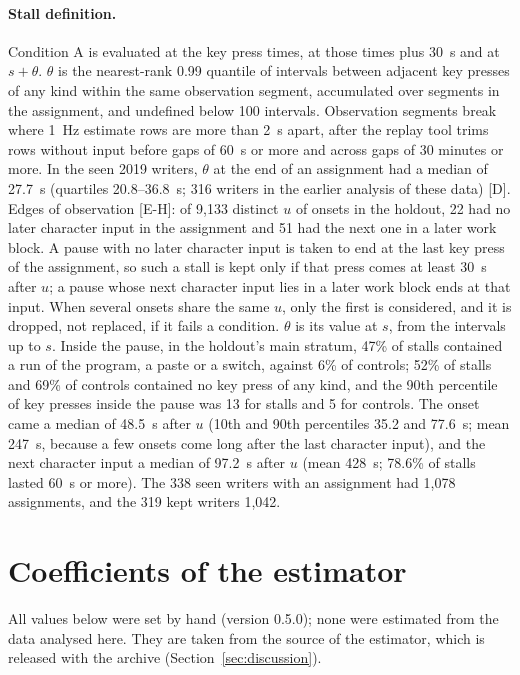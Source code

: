 \paragraph{Stall definition.} Condition A is evaluated at the key press times, at those times plus 30~s and at $s +
\theta$. $\theta$ is the nearest-rank 0.99 quantile of intervals between adjacent key presses of any kind within the
same observation segment, accumulated over segments in the assignment, and undefined below 100 intervals. Observation
segments break where 1~Hz estimate rows are more than 2~s apart, after the replay tool trims rows without input before
gaps of 60~s or more and across gaps of 30 minutes or more. In the seen 2019 writers, $\theta$ at the end of an
assignment had a median of 27.7~s (quartiles 20.8--36.8~s; 316 writers in the earlier analysis of these data) [D].
Edges of observation [E-H]: of 9,133 distinct $u$ of onsets in the holdout, 22 had no later character input in the
assignment and 51 had the next one in a later work block. A pause with no later character input is taken to end at the last key press of the assignment,
so such a stall is kept only if that press comes at least 30~s after $u$; a pause whose next character input lies in a
later work block ends at that input. When several onsets share the same $u$, only the first is considered, and it is
dropped, not replaced, if it fails a condition. $\theta$ is its value at $s$, from the intervals up to $s$. Inside the pause, in the holdout's main stratum, 47\% of stalls contained a run of the program, a paste or a switch,
against 6\% of controls; 52\% of stalls and 69\% of controls contained no key press of any kind, and the 90th percentile
of key presses inside the pause was 13 for stalls and 5 for controls. The onset came a median of 48.5~s after $u$ (10th and 90th percentiles 35.2 and 77.6~s; mean 247~s, because a few
onsets come long after the last character input), and the next character input a median of 97.2~s after $u$ (mean
428~s; 78.6\% of stalls lasted 60~s or more). The 338 seen writers with an assignment had 1,078
assignments, and the 319 kept writers 1,042.

\section{Coefficients of the estimator}
\label{app:coefficients}

All values below were set by hand (version 0.5.0); none were estimated from the data analysed here. They are taken
from the source of the estimator, which is released with the archive (Section~\ref{sec:discussion}).

